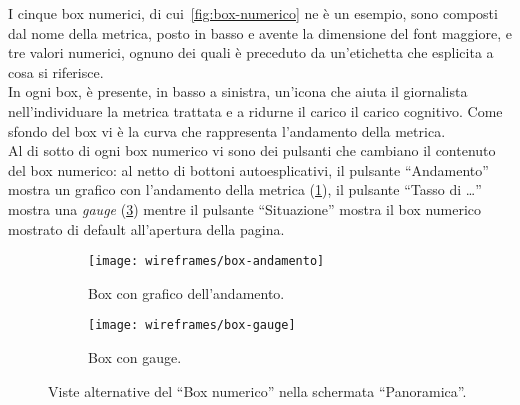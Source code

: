 \documentclass[../../../main.tex]{subfiles}
\begin{document}
I cinque box numerici, di cui~\ref{fig:box-numerico} ne è un esempio, sono composti dal nome della metrica, posto in basso e avente la dimensione del font maggiore, e tre valori numerici, ognuno dei quali è preceduto da un'etichetta che esplicita a cosa si riferisce.\\
In ogni box, è presente, in basso a sinistra, un'icona che aiuta il giornalista nell'individuare la metrica trattata e a ridurne il carico il carico cognitivo. Come sfondo del box vi è la curva che rappresenta l'andamento della metrica.\\
Al di sotto di ogni box numerico vi sono dei pulsanti che cambiano il contenuto del box numerico: al netto di bottoni autoesplicativi, il pulsante ``Andamento'' mostra un grafico con l'andamento della metrica (\ref{fig:box-andamento}), il pulsante ``Tasso di \dots'' mostra una \textit{gauge} (\ref{fig:box-gauge}) mentre il pulsante ``Situazione'' mostra il box numerico mostrato di default all'apertura della pagina.

\begin{figure}[H]
    \begin{subfigure}[b]{0.5\textwidth}
        \centering
        \texttt{[image: wireframes/box-andamento]}
        \caption{Box con grafico dell'andamento.}
        \label{fig:box-andamento}
    \end{subfigure}
\hfill
    \begin{subfigure}[b]{0.51\textwidth}
        \centering
        \texttt{[image: wireframes/box-gauge]}
        \caption{Box con gauge.}
        \label{fig:box-gauge}
    \end{subfigure}
    \caption{Viste alternative del ``Box numerico'' nella schermata ``Panoramica''.}
\end{figure}
\end{document}
